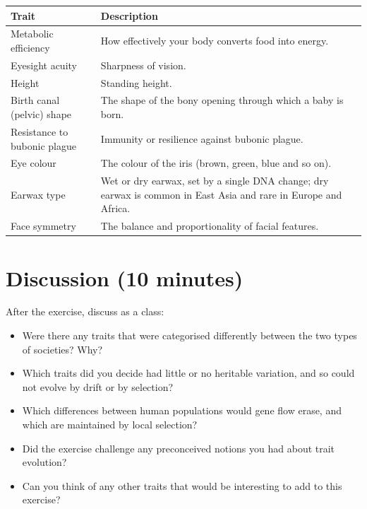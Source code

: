 \documentclass[
  a4paper]{book}
\newcounter{none} %
\providecommand{\tightlist}{%
  \setlength{\itemsep}{0pt}\setlength{\parskip}{0pt}}
\begin{document}
{\def\LTcaptype{none} %
\begin{longtable}[]{@{}
  >{\raggedright\arraybackslash}p{}
  >{\raggedright\arraybackslash}p{}@{}}
\toprule\noalign{}
\begin{minipage}[b]{\linewidth}\raggedright
Trait
\end{minipage} & \begin{minipage}[b]{\linewidth}\raggedright
Description
\end{minipage} \\
\midrule\noalign{}
\endhead
\bottomrule\noalign{}
\endlastfoot
Metabolic efficiency & How effectively your body converts food into energy. \\
Eyesight acuity & Sharpness of vision. \\
Height & Standing height. \\
Birth canal (pelvic) shape & The shape of the bony opening through which a baby is born. \\
Resistance to bubonic plague & Immunity or resilience against bubonic plague. \\
Eye colour & The colour of the iris (brown, green, blue and so on). \\
Earwax type & Wet or dry earwax, set by a single DNA change; dry earwax is common in East Asia and rare in Europe and Africa. \\
Face symmetry & The balance and proportionality of facial features. \\
\end{longtable}
}

\section{Discussion (10 minutes)}\label{discussion-10-minutes}

After the exercise, discuss as a class:

\begin{itemize}
\tightlist
\item
  Were there any traits that were categorised differently between the two types of societies? Why?
\item
  Which traits did you decide had little or no heritable variation, and so could not evolve by drift or by selection?
\item
  Which differences between human populations would gene flow erase, and which are maintained by local selection?
\item
  Did the exercise challenge any preconceived notions you had about trait evolution?
\item
  Can you think of any other traits that would be interesting to add to this exercise?
\end{itemize}
\end{document}
